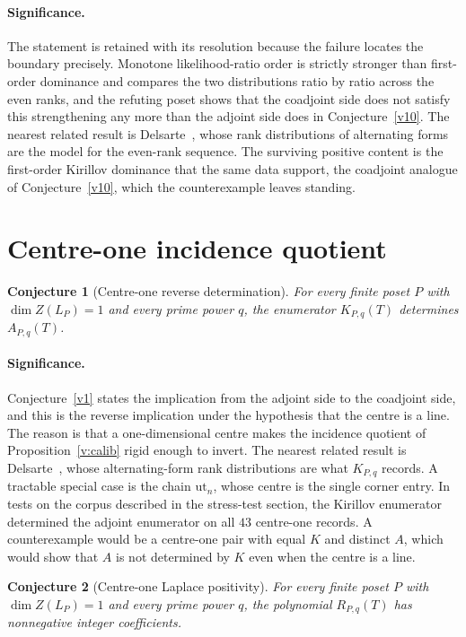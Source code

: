 \documentclass[11pt]{article}
\newtheorem{conjecture}{Conjecture}
\theoremstyle{definition}
\begin{document}
\paragraph{Significance.}
The statement is retained with its resolution because the failure locates the boundary precisely.  Monotone likelihood-ratio order is strictly stronger than first-order dominance and compares the two distributions ratio by ratio across the even ranks, and the refuting poset shows that the coadjoint side does not satisfy this strengthening any more than the adjoint side does in Conjecture~\ref{v10}.  The nearest related result is Delsarte~\cite{Del}, whose rank distributions of alternating forms are the model for the even-rank sequence.  The surviving positive content is the first-order Kirillov dominance that the same data support, the coadjoint analogue of Conjecture~\ref{v10}, which the counterexample leaves standing.

\section{Centre-one incidence quotient}

\begin{conjecture}[Centre-one reverse determination]\label{v12}
For every finite poset $P$ with $\dim Z(L_P)=1$ and every prime power $q$, the enumerator $K_{P,q}(T)$ determines $A_{P,q}(T)$.
\end{conjecture}

\paragraph{Significance.}
Conjecture~\ref{v1} states the implication from the adjoint side to the coadjoint side, and this is the reverse implication under the hypothesis that the centre is a line.  The reason is that a one-dimensional centre makes the incidence quotient of Proposition~\ref{v:calib} rigid enough to invert.  The nearest related result is Delsarte~\cite{Del}, whose alternating-form rank distributions are what $K_{P,q}$ records.  A tractable special case is the chain $\mathrm{ut}_n$, whose centre is the single corner entry.  In tests on the corpus described in the stress-test section, the Kirillov enumerator determined the adjoint enumerator on all $43$ centre-one records.  A counterexample would be a centre-one pair with equal $K$ and distinct $A$, which would show that $A$ is not determined by $K$ even when the centre is a line.

\begin{conjecture}[Centre-one Laplace positivity]\label{v13}
For every finite poset $P$ with $\dim Z(L_P)=1$ and every prime power $q$, the polynomial $R_{P,q}(T)$ has nonnegative integer coefficients.
\end{conjecture}
\end{document}
